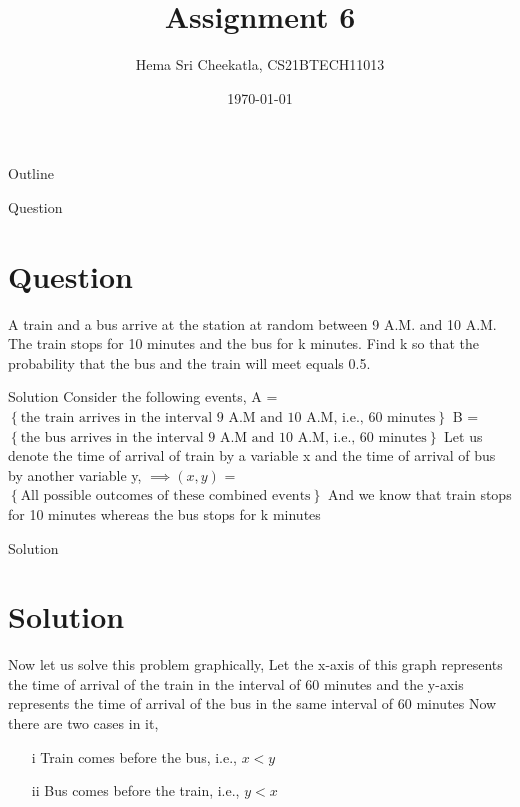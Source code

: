 \documentclass{beamer}
\title{Assignment 6}
\author{Hema Sri Cheekatla, CS21BTECH11013}
\date{\today}
\providecommand{\brak}[1]{\ensuremath{\left(#1\right)}}
\providecommand{\cbrak}[1]{\ensuremath{\left\{#1\right\}}}
\theoremstyle{remark}
\numberwithin{equation}{subsection}
\begin{document}
\begin{frame}
    \titlepage 
\end{frame}

\logo{}


\begin{frame}{Outline}
    \tableofcontents
\end{frame}

\begin{frame}{Question}
    \section{Question}
    A train and a bus arrive at the station at random between 9 A.M. and 10 A.M. The train stops for 10 minutes and the bus for k minutes. Find k so that the probability that the bus and the train will meet equals 0.5.
\end{frame}

\begin{frame}{Solution}
    Consider the following events,\newline
    A = $\cbrak{\text{the train arrives in the interval 9 A.M and 10 A.M, i.e., 60 minutes}}$\newline
    B = $\cbrak{\text{the bus arrives in the interval 9 A.M and 10 A.M, i.e., 60 minutes}}$\newline
    Let us denote the time of arrival of train by a variable x and the time of arrival of bus by another variable y,\newline
    $\implies \brak{x, y}$ = \cbrak{\text{All possible outcomes of these combined events}} \newline
    And we know that train stops for 10 minutes whereas the bus stops for k minutes
    
\end{frame}

\begin{frame}{Solution}
    \section{Solution}
    Now let us solve this problem graphically,
    Let the x-axis of this graph represents the time of arrival of the train in the interval of 60 minutes and the y-axis represents the time of arrival of the bus in the same interval of 60 minutes \newline
    Now there are two cases in it,
    \begin{itemize}
        \item[i] Train comes before the bus, i.e., $x < y$
        \item[ii] Bus comes before the train, i.e., $y < x$
    \end{itemize}
\end{frame}
\end{document}
